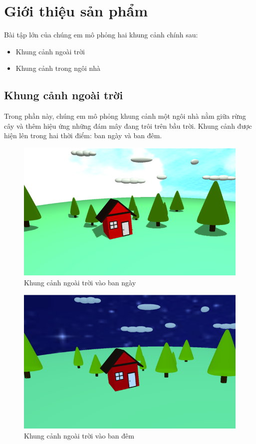 \section{Giới thiệu sản phẩm}
Bài tập lớn của chúng em mô phỏng hai khung cảnh chính sau:
\begin{itemize}
    \item Khung cảnh ngoài trời
    \item Khung cảnh trong ngôi nhà 
\end{itemize}
\subsection{Khung cảnh ngoài trời}
Trong phần này, chúng em mô phỏng khung cảnh một ngôi nhà nằm giữa rừng cây và thêm hiệu ứng những đám mây đang trôi trên bầu trời. Khung cảnh được hiện lên trong hai thời điểm: ban ngày và ban đêm. 
\begin{center}
    \begin{figure}[!h]
        \centering
        \includegraphics[scale = 0.85]{contents/out day.png}
        \caption{Khung cảnh ngoài trời vào ban ngày}
    \end{figure}
\end{center}
\newpage 
\begin{center}
    \begin{figure}[!h]
        \centering
        \includegraphics[scale = 0.85]{contents/outdoornight.png}
        \caption{Khung cảnh ngoài trời vào ban đêm}
    \end{figure}
\end{center}
